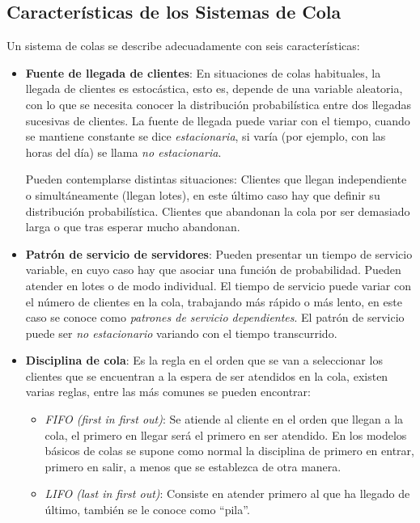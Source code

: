 \documentclass{article}
\begin{document}
\subsection{Características de los Sistemas de Cola}
Un sistema de colas se describe adecuadamente con seis características:
\begin{itemize}
    \item \textbf{Fuente de llegada de clientes}:  En situaciones de colas habituales, la llegada de clientes es estocástica, esto es, depende de una variable aleatoria, con lo que se necesita conocer la distribución probabilística entre dos llegadas sucesivas de clientes. La fuente de llegada puede variar con el tiempo, cuando se mantiene constante se dice \textit{estacionaria}, si varía (por ejemplo, con las horas del día) se llama \textit{no estacionaria}.

    Pueden contemplarse distintas situaciones: Clientes que llegan independiente o simultáneamente (llegan lotes), en este último caso hay que definir su distribución probabilística.  Clientes que abandonan la cola por ser demasiado larga o que tras esperar mucho abandonan.
    
    \item \textbf{Patrón de servicio de servidores}: Pueden presentar un tiempo de servicio variable, en cuyo caso hay que asociar una función de probabilidad. Pueden atender en lotes o de modo individual. El tiempo de servicio puede variar con el número de clientes en la cola, trabajando más rápido o más lento, en este caso se conoce como \textit{patrones de servicio dependientes}. El patrón de servicio puede ser \textit{no estacionario} variando con el tiempo transcurrido.
    
    \item \textbf{Disciplina de cola}: Es la regla en el orden que se van a seleccionar los clientes que se encuentran a la espera de ser atendidos en la cola, existen varias reglas, entre las más comunes se pueden encontrar:
        \begin{itemize}
            \item \textit{FIFO (first in first out)}: Se atiende al cliente en el orden que llegan a la cola, el primero en llegar será el primero en ser atendido. En los modelos básicos de colas se supone como normal la disciplina de primero en entrar, primero en salir, a menos que se establezca de otra manera.

            \item  \textit{LIFO (last in first out)}: Consiste en atender primero al que ha llegado de último, también se le conoce como ``pila''.


\end{itemize}
\end{itemize}
\end{document}
